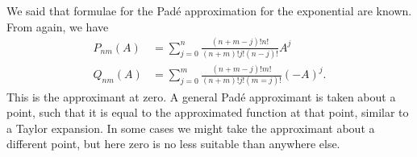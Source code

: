 We said that formulae for the Pad\'e approximation for the exponential are known. From \cite{moler2003dubious} again, we have
\begin{equation}
    \begin{aligned}
        P_{nm}(A) &= \sum_{j=0}^{n} \frac{(n+m-j)!n!}{(n+m)!j!(n-j)!}A^j \\
        Q_{nm}(A) &= \sum_{j=0}^{m} \frac{(n+m-j)!m!}{(n+m)!j!(m=j)!}(-A)^j.
    \end{aligned}
\end{equation}
This is the approximant at zero.
A general Pad\'e approximant is taken about a point, such that it is equal to the approximated function at that point, similar to a Taylor expansion.
In some cases we might take the approximant about a different point, but here zero is no less suitable than anywhere else.

